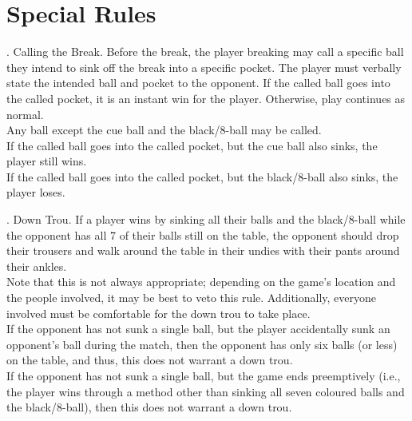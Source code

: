 \documentclass[a4paper, twocolumn]{article}
\def\PageTopMargin{2cm}
\def\PageLeftMargin{2cm}
\newcommand\atxy[3]{%
 \AddThispageHook{\smash{\hspace*{\dimexpr-\PageLeftMargin-\hoffset+#1\relax}%
  \raisebox{\dimexpr\PageTopMargin+\voffset-#2\relax}{#3}}}}
\newcommand{\itemspace}{\vspace{1.2mm}\\}
\newcommand{\placeframe}[1]{\atxy{-0.5cm}{29.1cm}{\texttt{[image: images/frame\#1]}}}
\begin{document}
\section{Special Rules} \label{special}
\ex. \label{callingthebreak} Calling the Break. Before the break, the player breaking may call a specific ball they intend to sink off the break into a specific pocket. The player must verbally state the intended ball and pocket to the opponent. If the called ball goes into the called pocket, it is an instant win for the player. Otherwise, play continues as normal.\itemspace Any ball except the cue ball and the black/8-ball may be called.\itemspace If the called ball goes into the called pocket, but the cue ball also sinks, the player still wins.\itemspace If the called ball goes into the called pocket, but the black/8-ball also sinks, the player loses.\par
\ex. Down Trou. If a player wins by sinking all their balls and the black/8-ball while the opponent has all 7 of their balls still on the table, the opponent should drop their trousers and walk around the table in their undies with their pants around their ankles.\itemspace Note that this is not always appropriate; depending on the game's location and the people involved, it may be best to veto this rule. Additionally, everyone involved must be comfortable for the down trou to take place.\itemspace If the opponent has not sunk a single ball, but the player accidentally sunk an opponent's ball during the match, then the opponent has only six balls (or less) on the table, and thus, this does not warrant a down trou.\itemspace If the opponent has not sunk a single ball, but the game ends preemptively (i.e., the player wins through a method other than sinking all seven coloured balls and the black/8-ball), then this does not warrant a down trou.\par

\placeframe{3}
\end{document}
